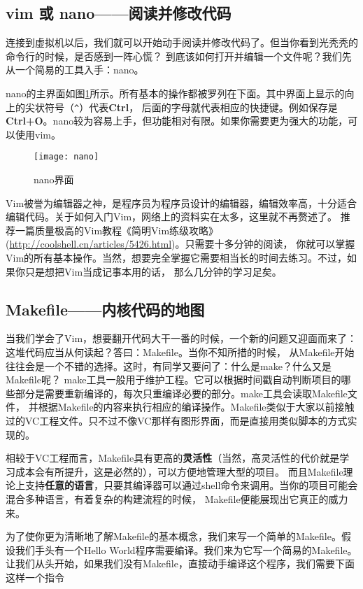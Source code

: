 \subsection{vim 或 nano——阅读并修改代码}
连接到虚拟机以后，我们就可以开始动手阅读并修改代码了。但当你看到光秃秃的命令行的时候，是否感到一阵心慌？
到底该如何打开并编辑一个文件呢？我们先从一个简易的工具入手：nano。

nano的主界面如图\ref{fig:nano}所示。所有基本的操作都被罗列在下面。其中界面上显示的向上的尖状符号（\verb|^|）代表\textbf{Ctrl}，
后面的字母就代表相应的快捷键。例如保存是\textbf{Ctrl+O}。nano较为容易上手，但功能相对有限。如果你需要更为强大的功能，可以使用vim。

\begin{figure}[htbp]
  \centering
  \texttt{[image: nano]}
  \caption{nano界面}\label{fig:nano} 
\end{figure}

Vim被誉为编辑器之神，是程序员为程序员设计的编辑器，编辑效率高，十分适合编辑代码。关于如何入门Vim，网络上的资料实在太多，这里就不再赘述了。
推荐一篇质量极高的Vim教程《简明Vim练级攻略》(\url{http://coolshell.cn/articles/5426.html})。只需要十多分钟的阅读，
你就可以掌握Vim的所有基本操作。当然，想要完全掌握它需要相当长的时间去练习。不过，如果你只是想把Vim当成记事本用的话，
那么几分钟的学习足矣。

\subsection{Makefile——内核代码的地图}
当我们学会了Vim，想要翻开代码大干一番的时候，一个新的问题又迎面而来了：这堆代码应当从何读起？答曰：Makefile。当你不知所措的时候，
从Makefile开始往往会是一个不错的选择。这时，有同学又要问了：什么是make？什么又是Makefile呢？
make工具一般用于维护工程。它可以根据时间戳自动判断项目的哪些部分是需要重新编译的，每次只重编译必要的部分。make工具会读取Makefile文件，
并根据Makefile的内容来执行相应的编译操作。Makefile类似于大家以前接触过的VC工程文件。只不过不像VC那样有图形界面，而是直接用类似脚本的方式实现的。

\begin{note}
相较于VC工程而言，Makefile具有更高的\textbf{灵活性}（当然，高灵活性的代价就是学习成本会有所提升，这是必然的），可以方便地管理大型的项目。
而且Makefile理论上支持\textbf{任意的语言}，只要其编译器可以通过shell命令来调用。当你的项目可能会混合多种语言，有着复杂的构建流程的时候，
Makefile便能展现出它真正的威力来。
\end{note}

为了使你更为清晰地了解Makefile的基本概念，我们来写一个简单的Makefile。假设我们手头有一个Hello World程序需要编译。我们来为它写一个简易的Makefile。
让我们从头开始，如果我们没有Makefile，直接动手编译这个程序，我们需要下面这样一个指令

